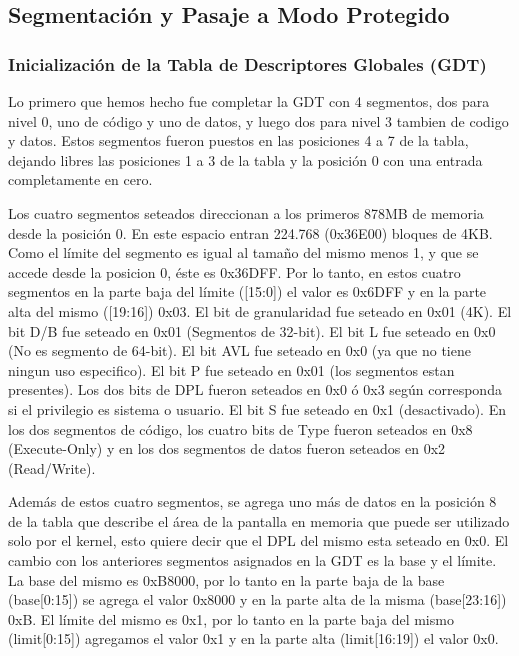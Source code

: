 \subsection{Segmentación y Pasaje a Modo Protegido}

\subsubsection{Inicialización de la Tabla de Descriptores Globales (GDT)}
Lo primero que hemos hecho fue completar la GDT con 4 segmentos, dos para nivel 0, uno de código y uno de datos, y luego dos para nivel 3 tambien de codigo y datos. Estos segmentos fueron puestos en las posiciones 4 a 7 de la tabla, dejando libres las posiciones 1 a 3 de la tabla y la posición 0 con una entrada completamente en cero.

Los cuatro segmentos seteados direccionan a los primeros 878MB de memoria desde la posición 0. En este espacio entran 224.768 (0x36E00) bloques de 4KB. Como el límite del segmento es igual al tamaño del mismo menos 1, y que se accede desde la posicion 0, éste es 0x36DFF. Por lo tanto, en estos cuatro segmentos en la parte baja del límite ([15:0]) el valor es 0x6DFF y en la parte alta del mismo ([19:16]) 0x03. El bit de granularidad fue seteado en 0x01 (4K). El bit D/B fue seteado en 0x01 (Segmentos de 32-bit). El bit L fue seteado en 0x0 (No es segmento de 64-bit). El bit AVL fue seteado en 0x0 (ya que no tiene ningun uso especifico). El bit P fue seteado en 0x01 (los segmentos estan presentes). Los dos bits de DPL fueron seteados en 0x0 ó 0x3 según corresponda si el privilegio es sistema o usuario. El bit S fue seteado en 0x1 (desactivado). En los dos segmentos de código, los cuatro bits de Type fueron seteados en 0x8 (Execute-Only) y en los dos segmentos de datos fueron seteados en 0x2 (Read/Write).

Además de estos cuatro segmentos, se agrega uno más de datos en la posición 8 de la tabla que describe el área de la pantalla en memoria que puede ser utilizado solo por el kernel, esto quiere decir que el DPL del mismo esta seteado en 0x0. El cambio con los anteriores segmentos asignados en la GDT es la base y el límite. La base del mismo es 0xB8000, por lo tanto en la parte baja de la base (base[0:15]) se agrega el valor 0x8000 y en la parte alta de la misma (base[23:16]) 0xB. El límite del mismo es 0x1, por lo tanto en la parte baja del mismo (limit[0:15]) agregamos el valor 0x1 y en la parte alta (limit[16:19]) el valor 0x0.

